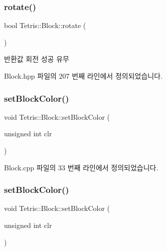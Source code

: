 \subsubsection{\texorpdfstring{rotate()}{rotate()}\hspace{0.1cm}{\footnotesize\ttfamily [2/2]}}
{\footnotesize\ttfamily bool Tetris\+::\+Block\+::rotate (\begin{DoxyParamCaption}{ }\end{DoxyParamCaption})\hspace{0.3cm}{\ttfamily [inline]}}

\begin{DoxyReturn}{반환값}
회전 성공 유무 
\end{DoxyReturn}


Block.\+hpp 파일의 207 번째 라인에서 정의되었습니다.

\mbox{\label{class_tetris_1_1_block_a1a3fab9e7eabe64a4ba588ed5091d3a9}} 
\subsubsection{\texorpdfstring{set\+Block\+Color()}{setBlockColor()}\hspace{0.1cm}{\footnotesize\ttfamily [1/2]}}
{\footnotesize\ttfamily void Tetris\+::\+Block\+::set\+Block\+Color (\begin{DoxyParamCaption}\item[{unsigned int}]{clr }\end{DoxyParamCaption})}



Block.\+cpp 파일의 33 번째 라인에서 정의되었습니다.

\mbox{\label{class_tetris_1_1_block_a1a3fab9e7eabe64a4ba588ed5091d3a9}} 
\subsubsection{\texorpdfstring{set\+Block\+Color()}{setBlockColor()}\hspace{0.1cm}{\footnotesize\ttfamily [2/2]}}
{\footnotesize\ttfamily void Tetris\+::\+Block\+::set\+Block\+Color (\begin{DoxyParamCaption}\item[{unsigned int}]{clr }\end{DoxyParamCaption})\hspace{0.3cm}{\ttfamily [inline]}}

